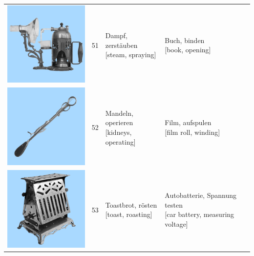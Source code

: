 \documentclass[
  english,
  doc,12pt,twoside,floatsintext]{apa7}
\begin{document}
\begin{center}
\begin{ThreePartTable}
{\begin{longtable}{llll}
\includegraphics[valign=c, scale=0.23]{../materials/unfamiliar/51.png} & 51 & \makecell[l]{Dampf, zerstäuben\\{[steam, spraying]}} & \makecell[l]{Buch, binden\\{[book, opening]}}\\
\includegraphics[valign=c, scale=0.23]{../materials/unfamiliar/52.png} & 52 & \makecell[l]{Mandeln, operieren\\{[kidneys, operating]}} & \makecell[l]{Film, aufspulen\\{[film roll, winding]}}\\
\includegraphics[valign=c, scale=0.23]{../materials/unfamiliar/53.png} & 53 & \makecell[l]{Toastbrot, rösten\\{[toast, roasting]}} & \makecell[l]{Autobatterie, Spannung testen\\{[car battery, measuring voltage]}}\\

\end{longtable}}
\end{ThreePartTable}
\end{center}
\end{document}
